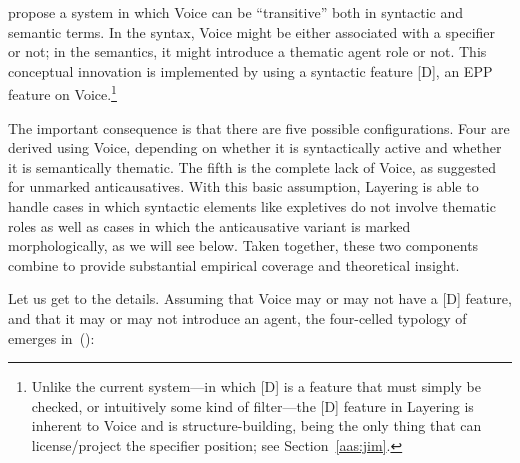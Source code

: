 \cite{layering15} propose a system in which Voice can be ``transitive'' both in syntactic and semantic terms. In the syntax, Voice might be either associated with a specifier or not; in the semantics, it might introduce a thematic agent role or not. This conceptual innovation is implemented by using a syntactic feature [D], an EPP feature on Voice.\footnote{Unlike the current system---in which [D] is a feature that must simply be checked, or intuitively some kind of filter---the [D] feature in Layering is inherent to Voice and is structure-building, being the only thing that can license/project the specifier position; see Section~\ref{aas:jim}.}

The important consequence is that there are five possible configurations. Four are derived using Voice, depending on whether it is syntactically active and whether it is semantically thematic. The fifth is the complete lack of Voice, as suggested for unmarked anticausatives. With this basic assumption, Layering is able to handle cases in which syntactic elements like expletives do not involve thematic roles as well as cases in which the anticausative variant is marked morphologically, as we will see below. Taken together, these two components combine to provide substantial empirical coverage and theoretical insight.

Let us get to the details. Assuming that Voice may or may not have a [D] feature, and that it may or may not introduce an agent, the four-celled typology of \citet[109]{layering15} emerges in~(\nextx):
\ex\label{ex:typo-layer}
\xe

